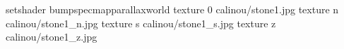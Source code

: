 setshader bumpspecmapparallaxworld
texture 0 calinou/stone1.jpg
texture n calinou/stone1_n.jpg
texture s calinou/stone1_s.jpg
texture z calinou/stone1_z.jpg
